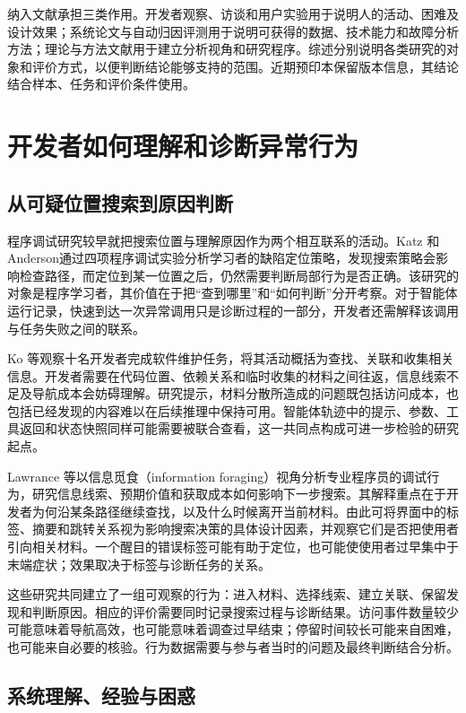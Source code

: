 纳入文献承担三类作用。开发者观察、访谈和用户实验用于说明人的活动、困难及设计效果；系统论文与自动归因评测用于说明可获得的数据、技术能力和故障分析方法；理论与方法文献用于建立分析视角和研究程序。综述分别说明各类研究的对象和评价方式，以便判断结论能够支持的范围。近期预印本保留版本信息，其结论结合样本、任务和评价条件使用。

\section{开发者如何理解和诊断异常行为}

\subsection{从可疑位置搜索到原因判断}

程序调试研究较早就把搜索位置与理解原因作为两个相互联系的活动。Katz 和 Anderson\cite{ref15}通过四项程序调试实验分析学习者的缺陷定位策略，发现搜索策略会影响检查路径，而定位到某一位置之后，仍然需要判断局部行为是否正确。该研究的对象是程序学习者，其价值在于把“查到哪里”和“如何判断”分开考察。对于智能体运行记录，快速到达一次异常调用只是诊断过程的一部分，开发者还需解释该调用与任务失败之间的联系。

Ko 等\cite{ref14}观察十名开发者完成软件维护任务，将其活动概括为查找、关联和收集相关信息。开发者需要在代码位置、依赖关系和临时收集的材料之间往返，信息线索不足及导航成本会妨碍理解。研究提示，材料分散所造成的问题既包括访问成本，也包括已经发现的内容难以在后续推理中保持可用。智能体轨迹中的提示、参数、工具返回和状态快照同样可能需要被联合查看，这一共同点构成可进一步检验的研究起点。

Lawrance 等\cite{ref08}以信息觅食（information foraging）视角分析专业程序员的调试行为，研究信息线索、预期价值和获取成本如何影响下一步搜索。其解释重点在于开发者为何沿某条路径继续查找，以及什么时候离开当前材料。由此可将界面中的标签、摘要和跳转关系视为影响搜索决策的具体设计因素，并观察它们是否把使用者引向相关材料。一个醒目的错误标签可能有助于定位，也可能使使用者过早集中于末端症状；效果取决于标签与诊断任务的关系。

这些研究共同建立了一组可观察的行为：进入材料、选择线索、建立关联、保留发现和判断原因。相应的评价需要同时记录搜索过程与诊断结果。访问事件数量较少可能意味着导航高效，也可能意味着调查过早结束；停留时间较长可能来自困难，也可能来自必要的核验。行为数据需要与参与者当时的问题及最终判断结合分析。

\subsection{系统理解、经验与困惑}

